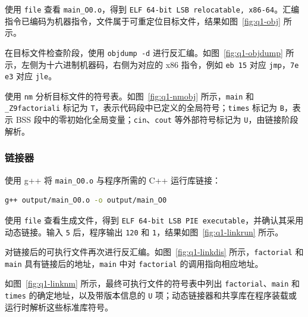 使用 \texttt{file} 查看 \texttt{main\_O0.o}，得到 \texttt{ELF 64-bit LSB relocatable, x86-64}。汇编指令已编码为机器指令，文件属于可重定位目标文件，结果如图~\ref{fig:q1-obj} 所示。


在目标文件检查阶段，使用 \texttt{objdump -d} 进行反汇编。如图~\ref{fig:q1-objdump} 所示，左侧为十六进制机器码，右侧为对应的 x86 指令，例如 \texttt{eb 15} 对应 \texttt{jmp}，\texttt{7e e3} 对应 \texttt{jle}。


使用 \texttt{nm} 分析目标文件的符号表。如图~\ref{fig:q1-nmobj} 所示，\texttt{main} 和 \texttt{\_Z9factoriali} 标记为 \texttt{T}，表示代码段中已定义的全局符号；\texttt{times} 标记为 \texttt{B}，表示 BSS 段中的零初始化全局变量；\texttt{cin}、\texttt{cout} 等外部符号标记为 \texttt{U}，由链接阶段解析。



\subsubsection{链接器}

使用 g++ 将 \texttt{main\_O0.o} 与程序所需的 C++ 运行库链接：

\begin{lstlisting}[language=bash]
g++ output/main_O0.o -o output/main_O0
\end{lstlisting}

使用 \texttt{file} 查看生成文件，得到 \texttt{ELF 64-bit LSB PIE executable}，并确认其采用动态链接。输入 \texttt{5} 后，程序输出 \texttt{120} 和 \texttt{1}，结果如图~\ref{fig:q1-linkrun} 所示。


对链接后的可执行文件再次进行反汇编。如图~\ref{fig:q1-linkdis} 所示，\texttt{factorial} 和 \texttt{main} 具有链接后的地址，\texttt{main} 中对 \texttt{factorial} 的调用指向相应地址。


如图~\ref{fig:q1-linknm} 所示，最终可执行文件的符号表中列出 \texttt{factorial}、\texttt{main} 和 \texttt{times} 的确定地址，以及带版本信息的 \texttt{U} 项；动态链接器和共享库在程序装载或运行时解析这些标准库符号。

